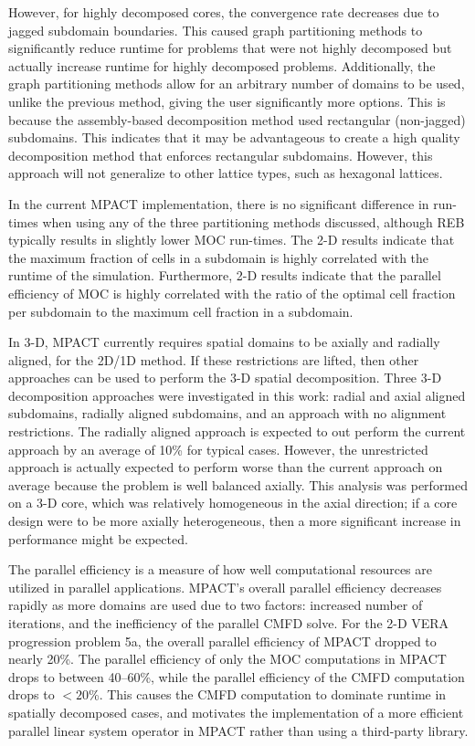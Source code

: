{{    However, for highly decomposed cores, the convergence rate decreases due to jagged subdomain boundaries.
    This caused graph partitioning methods to significantly reduce runtime for problems that were not highly decomposed but actually increase runtime for highly decomposed problems.
    Additionally, the graph partitioning methods allow for an arbitrary number of domains to be used, unlike the previous method, giving the user significantly more options.
    This is because the assembly-based decomposition method used rectangular (non-jagged) subdomains.
    This indicates that it may be advantageous to create a high quality decomposition method that enforces rectangular subdomains.
    However, this approach will not generalize to other lattice types, such as hexagonal lattices.

    In the current MPACT implementation, there is no significant difference in run-times when using any of the three partitioning methods discussed, although \ac{REB} typically results in slightly lower \ac{MOC} run-times.
    The 2-D results indicate that the maximum fraction of cells in a subdomain is highly correlated with the runtime of the simulation.
    Furthermore, 2-D results indicate that the parallel efficiency of \ac{MOC} is highly correlated with the ratio of the optimal cell fraction per subdomain to the maximum cell fraction in a subdomain.

    In 3-D, MPACT currently requires spatial domains to be axially and radially aligned, for the 2D/1D method.
    If these restrictions are lifted, then other approaches can be used to perform the 3-D spatial decomposition.
    Three 3-D decomposition approaches were investigated in this work: radial and axial aligned subdomains, radially aligned subdomains, and an approach with no alignment restrictions.
    The radially aligned approach is expected to out perform the current approach by an average of 10\% for typical cases.
    However, the unrestricted approach is actually expected to perform worse than the current approach on average because the problem is well balanced axially.
    This analysis was performed on a 3-D core, which was relatively homogeneous in the axial direction; if a core design were to be more axially heterogeneous, then a more significant increase in performance might be expected.

    The parallel efficiency is a measure of how well computational resources are utilized in parallel applications.
    MPACT's overall parallel efficiency decreases rapidly as more domains are used due to two factors: increased number of iterations, and the inefficiency of the parallel \ac{CMFD} solve.
    For the 2-D VERA progression problem 5a, the overall parallel efficiency of MPACT dropped to nearly 20\%.
    The parallel efficiency of only the \ac{MOC} computations in MPACT drops to between 40--60\%, while the parallel efficiency of the \ac{CMFD} computation drops to $<\!\!20$\%.
    This causes the \ac{CMFD} computation to dominate runtime in spatially decomposed cases, and motivates the implementation of a more efficient parallel linear system operator in MPACT rather than using a third-party library.

}}
